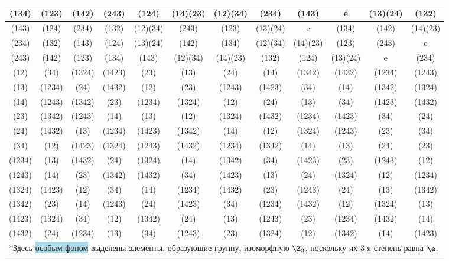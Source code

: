 \begin{enumerate}
\begin{table}[h!]
\begin{tabular}{c|ccccccccccc}
(134) & (123) & (142) & (243) & (124) & (14)(23) & (12)(34) & (234) & \cellcolor{lightBlue}(143) & \cellcolor{lightBlue}e & (13)(24) & (132) \\ \hline\rowcolor{lightGreen}
(143) & (124) & (234) & (132) & (12)(34) & (243) & (123) & (13)(24) & \cellcolor{lightBlue}e & \cellcolor{lightBlue}(134) & (142) & (14)(23) \\ \hline\rowcolor{lightGreen}
(234) & (132) & (143) & (124) & (13)(24) & (142) & (134) & (12)(34) & (14)(23) & (123) & \cellcolor{lightBlue}(243) & \cellcolor{lightBlue}e \\ \hline\rowcolor{lightGreen}
(243) & (142) & (123) & (134) & (143) & (12)(34) & (14)(23) & (132) & (124) & (13)(24) & \cellcolor{lightBlue}e & \cellcolor{lightBlue}(234) \\ \hline
\cellcolor{yellow}(12) &\cellcolor{yellow} (34) &\cellcolor{yellow} (1324) &\cellcolor{yellow} (1423) & (23) & (13) & (24) & (14) & (1342) & (1432) & (1234) & (1243) \\ \hline
(13) & (1234) & (24) & (1432) & (12) & (23) & (1243) & (1423) & (34) & (14) & (1342) & (1324) \\ \hline
(14) & (1243) & (1342) & (23) & (1234) & (1324) & (12) & (24) & (13) & (34) & (1423) & (1432) \\ \hline
(23) & (1342) & (1243) & (14) & (13) & (12) & (1324) & (1432) & (1234) & (1423) & (34) & (24) \\ \hline
(24) & (1432) & (13) & (1234) & (1423) & (1342) & (14) & (12) & (1324) & (1243) & (23) & (34) \\ \hline
\cellcolor{yellow}(34) &\cellcolor{yellow} (12) &\cellcolor{yellow} (1423) &\cellcolor{yellow} (1324) & (1243) & (1432) & (1234) & (1342) & (14) & (13) & (24) & (23) \\ \hline
(1234) & (13) & (1432) & (24) & (1324) & (14) & (1342) & (34) & (1423) & (23) & (1243) & (12) \\ \hline
(1243) & (14) & (23) & (1342) & (1432) & (34) & (1423) & (13) & (24) & (1324) & (12) & (1234) \\ \hline
\cellcolor{yellow}(1324) & \cellcolor{yellow}(1423) &\cellcolor{yellow} (12) &\cellcolor{yellow} (34) & (14) & (1234) & (1432) & (23) & (1243) & (24) & (13) & (1342) \\ \hline
(1342) & (23) & (14) & (1243) & (24) & (1423) & (34) & (1234) & (1432) & (12) & (1324) & (13) \\ \hline
\cellcolor{yellow}(1423) &\cellcolor{yellow} (1324) &\cellcolor{yellow} (34) &\cellcolor{yellow} (12) & (1342) & (24) & (13) & (1243) & (23) & (1234) & (1432) & (14) \\ \hline
(1432) & (24) & (1234) & (13) & (34) & (1243) & (23) & (1324) & (12) & (1342) & (14) & (1423) \\ \hline
\multicolumn{12}{l}{*Здесь \colorbox{lightBlue}{особым фоном} выделены элементы, образующие группу, изоморфную $\Z_3$, поскольку их 3-я степень равна $\e$.}
\end{tabular}
\end{table}


\end{enumerate}
